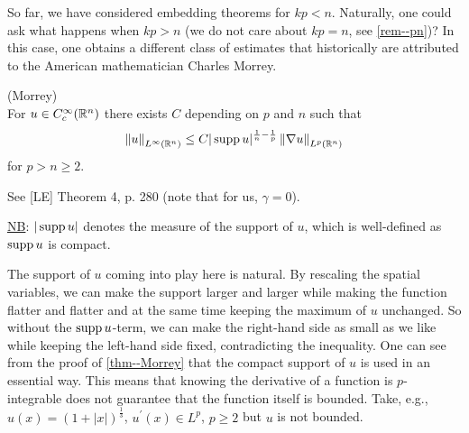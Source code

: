 \documentclass[11pt]{article}
\begin{document}
    		So far, we have considered embedding theorems for $kp<n$. Naturally, one could ask what happens when $kp>n$ (we do not care about $kp=n$, see \autoref{rem--pn})? In this case, one obtains a different class of estimates that historically are attributed to the American mathematician Charles Morrey.
    
    		\begin{thm}\label{thm--Morrey}
    			(Morrey)\\ For $u\in C^\infty_c(\mathbb{R}^n)$ there exists $C$ depending on $p$ and $n$ such that
    			\begin{equation*}
    				\norm{u}_{L^\infty(\mathbb{R}^n)}\le C |\operatorname{supp} u|^{\frac{1}{n}-\frac{1}{p}}\,\norm{\nabla u}_{L^p(\mathbb{R}^n)}
    			\end{equation*}
    			for $p>n\ge 2$.
    		\end{thm}
    		\begin{pproof}
    			See [LE] Theorem 4, p. 280 (note that for us, $\gamma=0$).
    		\end{pproof}
    
    		\noindent\underline{NB}: $|\operatorname{supp} u|$ denotes the measure of the support of $u$, which is well-defined as $\operatorname{supp} u$ is compact.
    
    		\begin{remark}
    			The support of $u$ coming into play here is natural. By rescaling the spatial variables, we can make the support larger and larger while making the function flatter and flatter and at the same time keeping the maximum of $u$ unchanged. So without the $\operatorname{supp} u$-term, we can make the right-hand side as small as we like while keeping the left-hand side fixed, contradicting the inequality. One can see from the proof of \autoref{thm--Morrey} that the compact support of $u$ is used in an essential way. This means that knowing the derivative of a function is $p$-integrable does not guarantee that the function itself is bounded. Take, e.g., $u(x)=(1+|x|)^{\frac{1}{3}}$, $u^\prime(x)\in L^p$, $p\ge2$ but $u$ is not bounded.
    		\end{remark}
    
\end{document}
